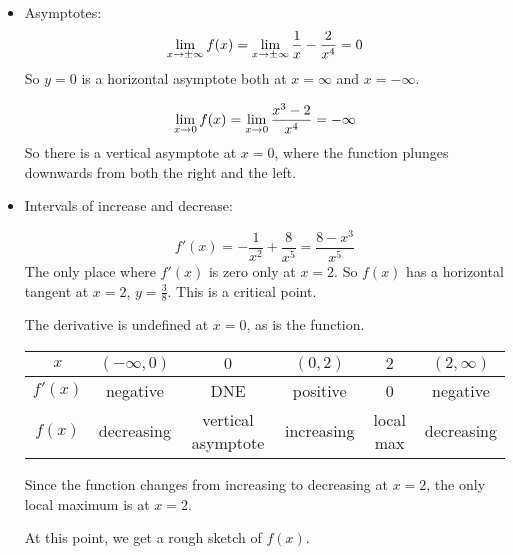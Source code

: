 \begin{solution}
\begin{itemize}
\item Asymptotes:
\[\displaystyle\lim_{x \to \pm \infty}f(x) = \displaystyle\lim_{x \to \pm \infty}\dfrac{1}{x}-\dfrac{2}{x^4}=0\]
So $y=0$ is a horizontal asymptote both at $x=\infty$ and
$x=-\infty$.

\[\displaystyle\lim_{x \to0}f(x) = \displaystyle\lim_{x \to 0}\dfrac{x^3-2}{x^4}=-\infty\]
So there is a vertical asymptote at  $x=0$, where the function plunges downwards from both the right and the left.

\item Intervals of increase and decrease:

\[f'(x)=-\frac{1}{x^2}+\frac{8}{x^5}=\frac{8-x^3}{x^5}\]
The only place where $f'(x)$ is zero only at $x=2$. So $f(x)$ has a horizontal tangent at $x=2$,
$y=\frac{3}{8}$. This is a critical point.

The derivative is undefined at $x=0$, as is the function.

\begin{center}
 \begin{tabular}{|c||c|c|c|c|c|}
\hline
$x$  & $(-\infty,0)$ &$0$ & $(0,2)$ & $2$&$(2,\infty)$ \\
\hline
$f'(x)$  & negative  & DNE & positive & 0&  negative\\
\hline
$f(x)$ & decreasing & vertical asymptote & increasing &local max & decreasing\\
\hline
 \end{tabular}
\end{center}

Since the function changes from increasing to decreasing at $x=2$, the only local maximum is at $x=2$.

At this point, we get a rough sketch of $f(x)$.
\begin{center}
\end{center}
%


\end{itemize}
\end{solution}
